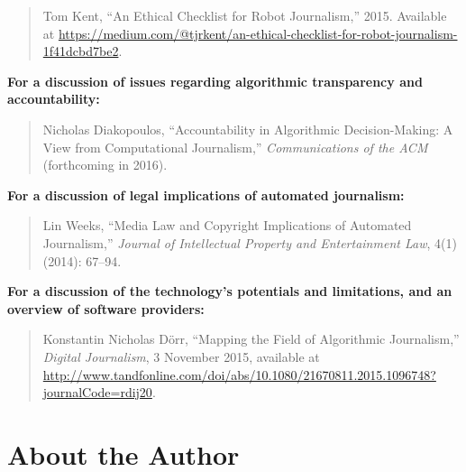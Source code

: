 \documentclass[notoc, symmetric, nobib, nols]{towcenter-guideto-book}
\begin{document}
\begin{quote}Tom Kent, ``An Ethical Checklist for Robot Journalism,'' 2015. Available at \href{https://medium.com/@tjrkent/an-ethical-checklist-for-robot-journalism-1f41dcbd7be2}{https://medium.com/@tjrkent/an-ethical-checklist-for-robot-journalism-1f41dcbd7be2}.   
\end{quote}
\noindent\textbf{For a discussion of issues regarding algorithmic transparency and accountability:}

\begin{quote}Nicholas Diakopoulos, ``Accountability in Algorithmic Decision-Making: A View from Computational Journalism,'' \textit{Communications of the ACM} (forthcoming in 2016).   
\end{quote}
\noindent\textbf{For a discussion of legal implications of automated journalism:}

\begin{quote}Lin Weeks, ``Media Law and Copyright Implications of Automated Journalism,'' \textit{Journal of Intellectual Property and Entertainment Law}, 4(1)(2014): 67--94.
\end{quote}
\noindent\textbf{For a discussion of the technology's potentials and limitations, and an overview of software providers:}

\begin{quote}Konstantin Nicholas Dörr, ``Mapping the Field of Algorithmic Journalism,'' \textit{Digital Journalism}, 3 November 2015, available at \href{http://www.tandfonline.com/doi/abs/10.1080/21670811.2015.1096748?journalCode=rdij20}{http://www.tandfonline.com/doi/abs/10.1080/21670811.2015.1096748?journalCode=rdij20}.
\end{quote}

\chapter{About the Author}
\end{document}
